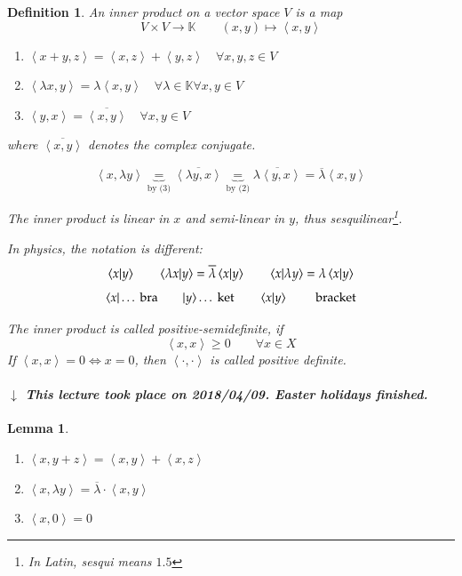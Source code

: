 \documentclass[a4paper]{article}
\newcounter{lecref}[section]
\numberwithin{lecref}{section}
\newtheorem{definition}[lecref]{Definition}
\newtheorem{lemma}[lecref]{Lemma}
\newcommand{\angel}[1]{\left\langle#1\right\rangle}
\newcommand{\dateref}[1]{%
  \begin{mdframed}[backgroundcolor=gray!10,innerbottommargin=0pt,innertopmargin=0pt]
    \paragraph{\textit{$\downarrow$ This lecture took place on #1.}}%
  \end{mdframed}%
}
\def\braket#1{\mathinner{\langle{#1}\rangle}}
\begin{document}
\begin{definition} %
  An inner product on a vector space $V$ is a map
  \[ V \times V \to \mathbb K \qquad (x,y) \mapsto \angel{x,y} \]
  \begin{enumerate}
    \item $\angel{x+y, z} = \angel{x,z} + \angel{y,z} \quad \forall x,y,z \in V$
    \item $\angel{\lambda x, y} = \lambda \angel{x,y} \quad \forall \lambda \in \mathbb K \forall x,y \in V$
    \item $\angel{y,x} = \overline{\angel{x,y}} \quad \forall x,y \in V$
  \end{enumerate}
  where $\overline{\angel{x,y}}$ denotes the complex conjugate.

  \[
    \angel{x, \lambda y} \underbrace{=}_{\text{by (3)}} \overline{\angel{\lambda y, x}}
      \underbrace{=}_{\text{by (2)}} \overline{\lambda \angel{y, x}}
      = \overline{\lambda} \angel{x,y}
  \]

  The inner product is linear in $x$ and semi-linear in $y$, thus \emph{sesquilinear}\footnote{In Latin, sesqui means $1.5$}.

  In physics, the notation is different:
  \[ \braket{x|y} \qquad \braket{\lambda x|y} = \overline{\lambda} \braket{x|y} \qquad \braket{x|\lambda y} = \lambda \braket{x|y} \]
  \[ \langle x| \dots \text{ bra} \qquad |y\rangle \dots \text{ ket} \qquad \braket{x|y} \qquad \text{ bracket} \]

  The inner product is called \emph{positive-semidefinite}, if
  \[ \angel{x,x} \geq 0 \qquad \forall x \in X \]
  If $\angel{x,x} = 0 \iff x = 0$, then $\angel{\cdot,\cdot}$ is called \emph{positive definite}.
\end{definition}

\dateref{2018/04/09. Easter holidays finished}

\begin{lemma} %
  \begin{enumerate}
    \item $\angel{x, y + z} = \angel{x, y} + \angel{x, z}$
    \item $\angel{x, \lambda y} = \overline{\lambda} \cdot \angel{x, y}$
    \item $\angel{x, 0} = 0$
  \end{enumerate}
\end{lemma}
\end{document}
